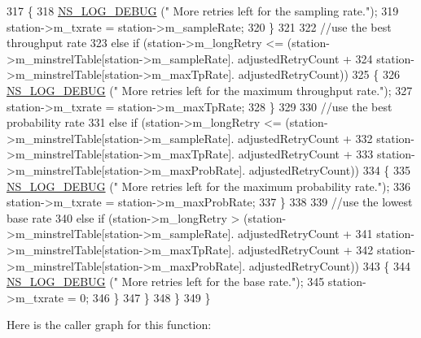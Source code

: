 \begin{DoxyCode}
317             \{
318               \hyperlink{group__logging_ga413f1886406d49f59a6a0a89b77b4d0a}{NS\_LOG\_DEBUG} (\textcolor{stringliteral}{" More retries left for the sampling rate."});
319               station->m\_txrate = station->m\_sampleRate;
320             \}
321 
322           \textcolor{comment}{//use the best throughput rate}
323           \textcolor{keywordflow}{else} \textcolor{keywordflow}{if} (station->m\_longRetry <= (station->m\_minstrelTable[station->m\_sampleRate].
      adjustedRetryCount +
324                                             station->m\_minstrelTable[station->m\_maxTpRate].
      adjustedRetryCount))
325             \{
326               \hyperlink{group__logging_ga413f1886406d49f59a6a0a89b77b4d0a}{NS\_LOG\_DEBUG} (\textcolor{stringliteral}{" More retries left for the maximum throughput rate."});
327               station->m\_txrate = station->m\_maxTpRate;
328             \}
329 
330           \textcolor{comment}{//use the best probability rate}
331           \textcolor{keywordflow}{else} \textcolor{keywordflow}{if} (station->m\_longRetry <= (station->m\_minstrelTable[station->m\_sampleRate].
      adjustedRetryCount +
332                                             station->m\_minstrelTable[station->m\_maxTpRate].
      adjustedRetryCount +
333                                             station->m\_minstrelTable[station->m\_maxProbRate].
      adjustedRetryCount))
334             \{
335               \hyperlink{group__logging_ga413f1886406d49f59a6a0a89b77b4d0a}{NS\_LOG\_DEBUG} (\textcolor{stringliteral}{" More retries left for the maximum probability rate."});
336               station->m\_txrate = station->m\_maxProbRate;
337             \}
338 
339           \textcolor{comment}{//use the lowest base rate}
340           \textcolor{keywordflow}{else} \textcolor{keywordflow}{if} (station->m\_longRetry > (station->m\_minstrelTable[station->m\_sampleRate].
      adjustedRetryCount +
341                                            station->m\_minstrelTable[station->m\_maxTpRate].
      adjustedRetryCount +
342                                            station->m\_minstrelTable[station->m\_maxProbRate].
      adjustedRetryCount))
343             \{
344               \hyperlink{group__logging_ga413f1886406d49f59a6a0a89b77b4d0a}{NS\_LOG\_DEBUG} (\textcolor{stringliteral}{" More retries left for the base rate."});
345               station->m\_txrate = 0;
346             \}
347         \}
348     \}
349 \}
\end{DoxyCode}


Here is the caller graph for this function\+:


